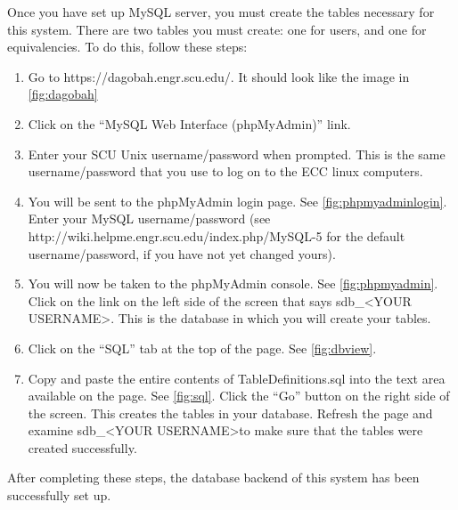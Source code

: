 \documentclass{article}
\begin{document}
\par Once you have set up MySQL server, you must create the tables necessary for
this system.  There are two tables you must create: one for users, and one for
equivalencies.  To do this, follow these steps:
\begin{enumerate}
\item Go to https://dagobah.engr.scu.edu/.  It should look like the image in
\cref{fig:dagobah}
\item Click on the ``MySQL Web Interface (phpMyAdmin)'' link.
\item Enter your SCU Unix username/password when prompted. This is the same
username/password that you use to log on to the ECC linux computers.
\item You will be sent to the phpMyAdmin login page. See \cref{fig:phpmyadminlogin}.
Enter your MySQL
username/password (see http://wiki.helpme.engr.scu.edu/index.php/MySQL-5 for
the default username/password, if you have not yet changed yours).
\item You will now be taken to the phpMyAdmin console. See \cref{fig:phpmyadmin}.
Click on the link on the left side of the screen that says sdb\_\textless YOUR
USERNAME\textgreater .
This is the database in which you will create your tables.
\item Click on the ``SQL'' tab at the top of the page. See \cref{fig:dbview}.
\item Copy and paste the entire contents of TableDefinitions.sql into the text
area available on the page. See \cref{fig:sql}.  Click the ``Go'' button on the
right side of the screen.  This creates the tables in your database.  Refresh
the page and examine sdb\_\textless YOUR USERNAME\textgreater  to make sure that
the tables were
created successfully.
\end{enumerate}
\par After completing these steps, the database backend of this system has been
successfully set up.
\end{document}

